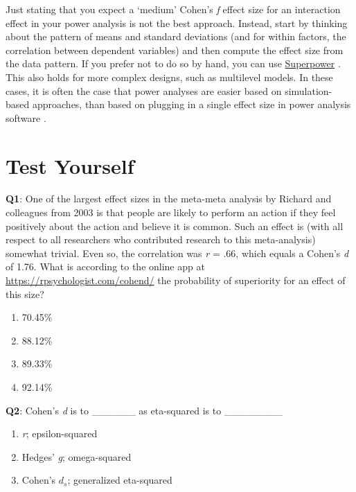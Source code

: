 \documentclass[
  oneside]{book}
\providecommand{\tightlist}{%
  \setlength{\itemsep}{0pt}\setlength{\parskip}{0pt}}
\begin{document}
Just stating that you expect a `medium' Cohen's \emph{f} effect size for an interaction effect in your power analysis is not the best approach. Instead, start by thinking about the pattern of means and standard deviations (and for within factors, the correlation between dependent variables) and then compute the effect size from the data pattern. If you prefer not to do so by hand, you can use \href{https://aaroncaldwell.us/SuperpowerBook/}{Superpower} \citep{lakens_simulation-based_2021}. This also holds for more complex designs, such as multilevel models. In these cases, it is often the case that power analyses are easier based on simulation-based approaches, than based on plugging in a single effect size in power analysis software \citep{debruine_understanding_2021}.

\hypertarget{test-yourself-4}{%
\section{Test Yourself}\label{test-yourself-4}}

\textbf{Q1}: One of the largest effect sizes in the meta-meta analysis by Richard and colleagues from 2003 is that people are likely to perform an action if they feel positively about the action and believe it is common. Such an effect is (with all respect to all researchers who contributed research to this meta-analysis) somewhat trivial. Even so, the correlation was \emph{r} = .66, which equals a Cohen's \emph{d} of 1.76. What is according to the online app at \url{https://rpsychologist.com/cohend/} the probability of superiority for an effect of this size?

\begin{enumerate}
\def\labelenumi{\Alph{enumi})}
\tightlist
\item
  70.45\%
\item
  88.12\%
\item
  89.33\%
\item
  92.14\%
\end{enumerate}

\textbf{Q2}: Cohen's \emph{d} is to \_\_\_\_\_\_ as eta-squared is to \_\_\_\_\_\_\_\_

\begin{enumerate}
\def\labelenumi{\Alph{enumi})}
\tightlist
\item
  \emph{r}; epsilon-squared
\item
  Hedges' \emph{g}; omega-squared
\item
  Cohen's \(d_s\); generalized eta-squared
\end{enumerate}
\end{document}
